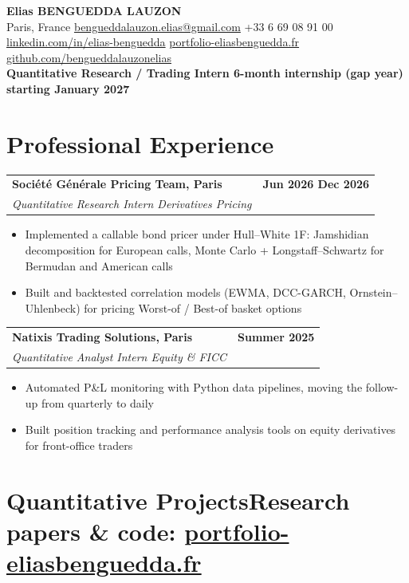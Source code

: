 \documentclass[11pt,a4paper]{article}
\makeatletter
\newcommand{\entry}[3]{%
  \begin{tabular*}{\textwidth}{@{\extracolsep{\fill}}l r}
    \textbf{#1} & \textbf{#2} \\
    \textit{#3} & \\
  \end{tabular*}\vspace{-2pt}}
\newcommand{\portfolio}[1]{\href{https://portfolio-eliasbenguedda.fr}{\textcolor{linkblue}{#1}}}
\makeatother
\begin{document}
\begin{center}
  {\LARGE\bfseries Elias BENGUEDDA LAUZON}\\[2pt]
  Paris, France \textbar{}
  \href{mailto:bengueddalauzon.elias@gmail.com}{bengueddalauzon.elias@gmail.com} \textbar{} +33 6 69 08 91 00\\
  \href{https://linkedin.com/in/elias-benguedda}{linkedin.com/in/elias-benguedda} \textbar{}
  \portfolio{portfolio-eliasbenguedda.fr} \textbar{}
  \href{https://github.com/bengueddalauzonelias}{github.com/bengueddalauzonelias}\\[3pt]
  \textbf{Quantitative Research / Trading Intern \textendash{} 6-month internship (gap year) starting January 2027}
\end{center}
\vspace{-4pt}

\section{Professional Experience}

\entry{Société Générale \textendash{} Pricing Team, Paris}{Jun 2026 \textendash{} Dec 2026}{Quantitative Research Intern \textendash{} Derivatives Pricing}
\begin{itemize}
  \item Implemented a callable bond pricer under Hull--White 1F: Jamshidian decomposition for European calls, Monte Carlo + Longstaff--Schwartz for Bermudan and American calls
  \item Built and backtested correlation models (EWMA, DCC-GARCH, Ornstein--Uhlenbeck) for pricing Worst-of / Best-of basket options
\end{itemize}

\entry{Natixis \textendash{} Trading Solutions, Paris}{Summer 2025}{Quantitative Analyst Intern \textendash{} Equity \& FICC}
\begin{itemize}
  \item Automated P\&L monitoring with Python data pipelines, moving the follow-up from quarterly to daily
  \item Built position tracking and performance analysis tools on equity derivatives for front-office traders
\end{itemize}

\section{Quantitative Projects\hfill\normalfont\normalsize Research papers \& code: \portfolio{\textbf{portfolio-eliasbenguedda.fr}}}
\end{document}
